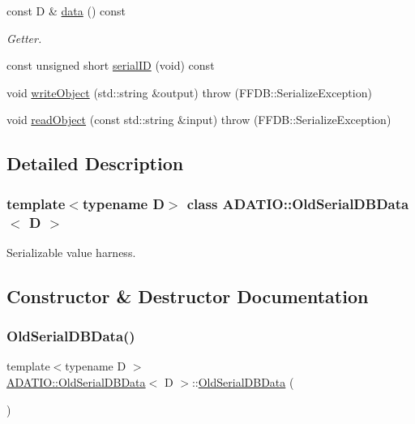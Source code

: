 \begin{DoxyCompactItemize}
const D \& \mbox{\hyperlink{classADATIO_1_1OldSerialDBData_a4d5c8f72f1f572f26127f728b202e345}{data}} () const
\begin{DoxyCompactList}\small\item\em Getter. \end{DoxyCompactList}\item 
const unsigned short \mbox{\hyperlink{classADATIO_1_1OldSerialDBData_a379c8edee426f2a5ce3f41d0c46777de}{serial\+ID}} (void) const
\item 
void \mbox{\hyperlink{classADATIO_1_1OldSerialDBData_aec52af4bfb6beb74fc039b9b25328270}{write\+Object}} (std\+::string \&output)  throw (\+F\+F\+D\+B\+::\+Serialize\+Exception)
\item 
void \mbox{\hyperlink{classADATIO_1_1OldSerialDBData_aad0338cd19224fe3eb6223afe7e2c2c4}{read\+Object}} (const std\+::string \&input)  throw (\+F\+F\+D\+B\+::\+Serialize\+Exception)
\end{DoxyCompactItemize}


\subsection{Detailed Description}
\subsubsection*{template$<$typename D$>$\newline
class A\+D\+A\+T\+I\+O\+::\+Old\+Serial\+D\+B\+Data$<$ D $>$}

Serializable value harness. 



\subsection{Constructor \& Destructor Documentation}
\mbox{\label{classADATIO_1_1OldSerialDBData_a189c0c4ac35db492b9cbc68deb15c5dd}} 
\subsubsection{\texorpdfstring{OldSerialDBData()}{OldSerialDBData()}\hspace{0.1cm}{\footnotesize\ttfamily [1/6]}}
{\footnotesize\ttfamily template$<$typename D $>$ \\
\mbox{\hyperlink{classADATIO_1_1OldSerialDBData}{A\+D\+A\+T\+I\+O\+::\+Old\+Serial\+D\+B\+Data}}$<$ D $>$\+::\mbox{\hyperlink{classADATIO_1_1OldSerialDBData}{Old\+Serial\+D\+B\+Data}} (\begin{DoxyParamCaption}{ }\end{DoxyParamCaption})\hspace{0.3cm}{\ttfamily [inline]}}



